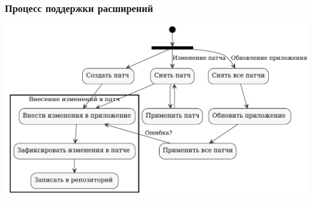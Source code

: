 \documentclass[unicode]{beamer}
\begin{document}
\begin{frame}
\transwipe[direction=90]
\frametitle{Процесс поддержки расширений}
\centerline{\includegraphics[width=1\textwidth]{mq-workflow.pdf}}
\end{frame}

\end{document}
